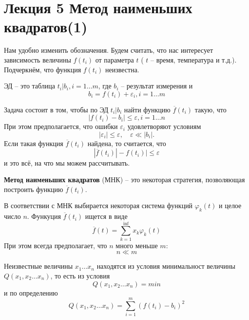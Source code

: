 \section{Лекция 5 Метод наименьших квадратов(1)}
Нам удобно изменить обозначения. Будем считать, что нас интересует зависимость величины $f(t_i)$ от параметра  $t$ ( $t$ -- время, температура и т.д.). Подчеркнём, что функция $f(t_i)$ неизвестна.

ЭД -- это таблица $t_i | b_i, i = 1 \dots m$, где $b_i$ -- результат измерения и 
\begin{equation}
	b_i = f(t_i) + \varepsilon_i, i = 1 \dots m
\end{equation}

Задача состоит в том, чтобы по ЭД  $t_i | b_i$ найти функцию $\overline f(t_i)$ такую, что 
\begin{equation}
	|f(t_i) - b_i| \leq \varepsilon,  i = 1 \dots n
\end{equation}
При этом предполагается, что ошибки $\varepsilon_i$ удовлетворяют условиям
\begin{equation}
	|\varepsilon_i | \leq \varepsilon , \quad \varepsilon \ll  |b_i| .
\end{equation}
Если такая функция $\overline f(t_i)$ найдена, то считается, что
\begin{equation}
	|\overline f(t_i)| - f(t_i) | \leq \varepsilon
\end{equation}
и это всё, на что мы можем рассчитывать.

\vspace{1cm}
\textbf{Метод наименьших квадратов} (МНК) --  это некоторая стратегия, позволяющая построить функцию $\overline f(t_i)$.

В соответствии с МНК выбирается некоторая система функций $\varphi_k (t) $ и целое число $n$. Функуция $\overline f(t_i)$ ищется в виде 
\begin{equation}
	\overline{f} (t) = \sum_{k=1}^\inf {x_k \varphi_k (t) }
\end{equation}
При этом всегда предполагает, что $n$ много меньше $m$:
\begin{equation}
	n \ll m
\end{equation}

Неизвестные величины $x_1 \dots x_n$ находятся из условия минимальност величины $Q(x_1, x_2 \dots x_n)$, то есть из условия
\begin{equation} \label{eq:5.7}
	Q(x_1, x_2 \dots x_n) = min
\end{equation}
и по определению
\begin{equation} 
	Q(x_1, x_2 \dots x_n) = \sum_{i=1}^m {(f(t_i) - b_i)^2}
\end{equation}

